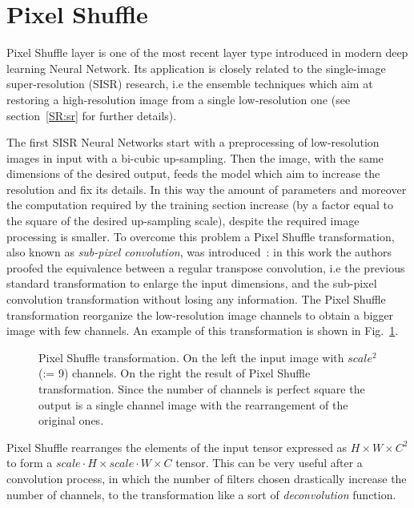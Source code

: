 \documentclass{standalone}
\begin{document}

\section[Pixel Shuffle]{Pixel Shuffle}\label{NN:shuffler}

Pixel Shuffle layer is one of the most recent layer type introduced in modern deep learning Neural Network.
Its application is closely related to the single-image super-resolution (SISR) research, i.e the ensemble techniques which aim at restoring a high-resolution image from a single low-resolution one (see section~\ref{SR:sr} for further details).

The first SISR Neural Networks start with a preprocessing of low-resolution images in input with a bi-cubic up-sampling.
Then the image, with the same dimensions of the desired output, feeds the model which aim to increase the resolution and fix its details.
In this way the amount of parameters and moreover the computation required by the training section increase (by a factor equal to the square of the desired up-sampling scale), despite the required image processing is smaller.
To overcome this problem a Pixel Shuffle transformation, also known as \emph{sub-pixel convolution}, was introduced~\cite{Wenzhe2016Shuffle}: in this work the authors proofed the equivalence between a regular transpose convolution, i.e the previous standard transformation to enlarge the input dimensions, and the sub-pixel convolution transformation without losing any information.
The Pixel Shuffle transformation reorganize the low-resolution image channels to obtain a bigger image with few channels.
An example of this transformation is shown in Fig.~\ref{fig:pixel_shuffle}.

\begin{figure}[htbp]
\centering
\def\svgwidth{0.7\textwidth}

\caption{Pixel Shuffle transformation.
On the left the input image with $scale^2$ (:= 9) channels.
On the right the result of Pixel Shuffle transformation.
Since the number of channels is perfect square the output is a single channel image with the rearrangement of the original ones.
}
\label{fig:pixel_shuffle}
\end{figure}

Pixel Shuffle rearranges the elements of the input tensor expressed as $H \times W \times C^2$ to form a $scale \cdot H \times scale \cdot W \times C$ tensor.
This can be very useful after a convolution process, in which the number of filters chosen drastically increase the number of channels, to  the transformation like a sort of \emph{deconvolution} function.
\end{document}
